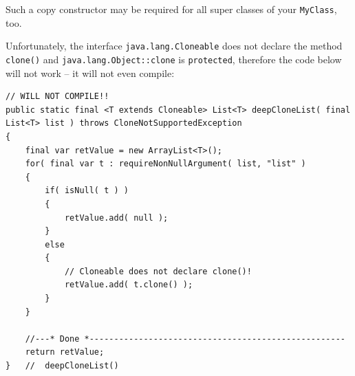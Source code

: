 \documentclass[11pt,a4paper, titlepage, parskip=half, headsepline, footsepline, cleardoublepage=current, headheight=1cm]{scrbook}
\begin{document}
Such a copy constructor may be required for all super classes of your \lstinline|MyClass|, too.

Unfortunately, the interface \lstinline|java.lang.Cloneable| does not declare the method \lstinline|clone()| and \lstinline|java.lang.Object::clone| is \lstinline|protected|, therefore the code below will not work – it will not even compile:
\begin{lstlisting}
// WILL NOT COMPILE!!
public static final <T extends Cloneable> List<T> deepCloneList( final List<T> list ) throws CloneNotSupportedException
{
	final var retValue = new ArrayList<T>();
	for( final var t : requireNonNullArgument( list, "list" ) 
    {
        if( isNull( t ) )
        {
            retValue.add( null );
        }
        else    
        {
            // Cloneable does not declare clone()!
            retValue.add( t.clone() );
        }
    } 

    //---* Done *----------------------------------------------------
    return retValue;
}   //  deepCloneList()
\end{lstlisting}
\end{document}
